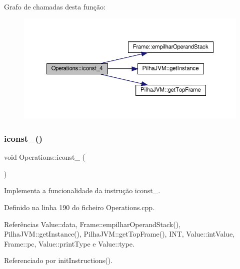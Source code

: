 Grafo de chamadas desta função\+:
\nopagebreak
\begin{figure}[H]
\begin{center}
\leavevmode
\includegraphics[width=350pt]{classOperations_a5fad2dad3d79c889728a6687f36e1192_cgraph}
\end{center}
\end{figure}
\mbox{\label{classOperations_a87a4c7214825d084ded4a8ea50e4af7c}} 
\subsubsection{\texorpdfstring{iconst\+\_()}{iconst\_5()}}
{\footnotesize\ttfamily void Operations\+::iconst\+\_ (\begin{DoxyParamCaption}{ }\end{DoxyParamCaption})\hspace{0.3cm}{\ttfamily [private]}}



Implementa a funcionalidade da instrução iconst\+\_. 



Definido na linha 190 do ficheiro Operations.\+cpp.



Referências Value\+::data, Frame\+::empilhar\+Operand\+Stack(), Pilha\+J\+V\+M\+::get\+Instance(), Pilha\+J\+V\+M\+::get\+Top\+Frame(), I\+NT, Value\+::int\+Value, Frame\+::pc, Value\+::print\+Type e Value\+::type.



Referenciado por init\+Instructions().

